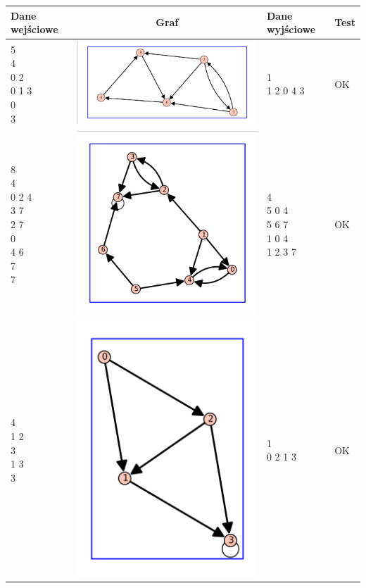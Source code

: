 \documentclass[a4paper,10pt]{article}
\begin{document}
\begin{center}
\begin{tabular}{|l|c|l|l|}\hline
{\bf Dane wejściowe}&{\bf Graf}&{\bf Dane wyjściowe}&{\bf Test}\\ \hline
\shortstack[l]{
5\\
4\\
0 2\\
0 1 3\\
0\\
3
}
&\includegraphics[width=5 cm]{sample_data5}&
\shortstack[l]{
1\\
1 2 0 4 3 
}
&OK\\ \hline

\shortstack[l]{
8\\
4\\
0 2 4\\
3 7\\
2 7\\
0\\
4 6\\
7\\
7
}
&\includegraphics[width=5 cm]{sample_data6}&
\shortstack[l]{
4\\
5 0 4\\
5 6 7\\
1 0 4\\
1 2 3 7 
}
&OK\\ \hline

\shortstack[l]{
4\\
1 2\\
3\\
1 3\\
3
}
&\includegraphics[width=3 cm]{sample_data7}&
\shortstack[l]{
1\\
0 2 1 3
}
&OK\\ \hline


\end{tabular}
\end{center}
\end{document}
